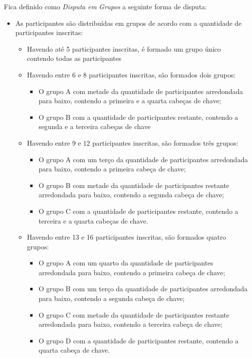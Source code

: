 \noindent
Fica definido como \textit{Disputa em Grupos} a seguinte forma de disputa:
\begin{itemize}[noitemsep]
	\item As participantes são distribuídas em grupos de acordo com a quantidade de participantes inscritas:
	\begin{itemize}[noitemsep]
		\item Havendo até 5 participantes inscritas, é formado um grupo único contendo todas as participantes

		\item Havendo entre 6 e 8 participantes inscritas, são formados dois grupos:
		\begin{itemize}[noitemsep]
			\item O grupo A com metade da quantidade de participantes arredondada para baixo, contendo a primeira e a quarta cabeças de chave;
			\item O grupo B com a quantidade de participantes restante, contendo a segunda e a terceira cabeças de chave
		\end{itemize}

		\item Havendo entre 9 e 12 participantes inscritas, são formados três grupos:
		\begin{itemize}[noitemsep]
			\item O grupo A com um terço da quantidade de participantes arredondada para baixo, contendo a primeira cabeça de chave;
			\item O grupo B com metade da quantidade de participantes restante arredondada para baixo, contendo a segunda cabeça de chave;
			\item O grupo C com a quantidade de participantes restante, contendo a terceira e a quarta cabeças de chave.
		\end{itemize}

		\item Havendo entre 13 e 16 participantes inscritas, são formados quatro grupos:
		\begin{itemize}[noitemsep]
			\item O grupo A com um quarto da quantidade de participantes arredondada para baixo, contendo a primeira cabeça de chave;
			\item O grupo B com um terço da quantidade de participantes arredondada para baixo, contendo a segunda cabeça de chave;
			\item O grupo C com metade da quantidade de participantes restante arredondada para baixo, contendo a terceira cabeça de chave;
			\item O grupo D com a quantidade de participantes restante, contendo a quarta cabeça de chave.
		\end{itemize}
	\end{itemize}


\end{itemize}
